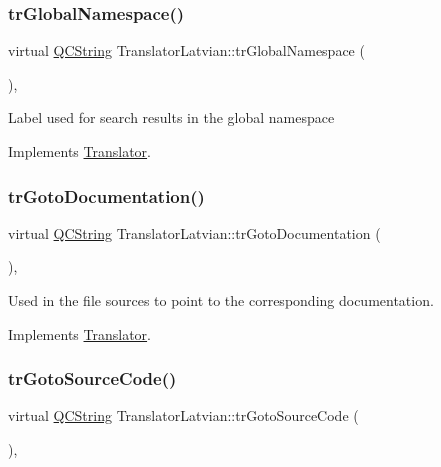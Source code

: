 \subsubsection{\texorpdfstring{trGlobalNamespace()}{trGlobalNamespace()}}
{\footnotesize\ttfamily virtual \mbox{\hyperlink{class_q_c_string}{Q\+C\+String}} Translator\+Latvian\+::tr\+Global\+Namespace (\begin{DoxyParamCaption}{ }\end{DoxyParamCaption})\hspace{0.3cm}{\ttfamily [inline]}, {\ttfamily [virtual]}}

Label used for search results in the global namespace 

Implements \mbox{\hyperlink{class_translator}{Translator}}.

\mbox{\label{class_translator_latvian_afe1b55d8d8cd600a5c72b96315d2fb65}} 
\subsubsection{\texorpdfstring{trGotoDocumentation()}{trGotoDocumentation()}}
{\footnotesize\ttfamily virtual \mbox{\hyperlink{class_q_c_string}{Q\+C\+String}} Translator\+Latvian\+::tr\+Goto\+Documentation (\begin{DoxyParamCaption}{ }\end{DoxyParamCaption})\hspace{0.3cm}{\ttfamily [inline]}, {\ttfamily [virtual]}}

Used in the file sources to point to the corresponding documentation. 

Implements \mbox{\hyperlink{class_translator}{Translator}}.

\mbox{\label{class_translator_latvian_af7cc65b07ccde8f2fe503c65c4308b95}} 
\subsubsection{\texorpdfstring{trGotoSourceCode()}{trGotoSourceCode()}}
{\footnotesize\ttfamily virtual \mbox{\hyperlink{class_q_c_string}{Q\+C\+String}} Translator\+Latvian\+::tr\+Goto\+Source\+Code (\begin{DoxyParamCaption}{ }\end{DoxyParamCaption})\hspace{0.3cm}{\ttfamily [inline]}, {\ttfamily [virtual]}}

